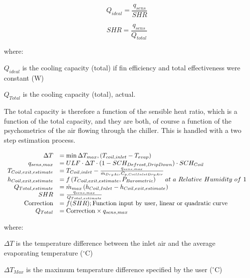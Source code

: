 \begin{equation}
  Q_{ideal} = \frac{q_{sens}}{SHR}
\end{equation}

\begin{equation}
  SHR = \frac{q_{sens}}{Q_{total}}
\end{equation}

where:

\({Q_{ideal}}\) is the cooling capacity (total) if fin efficiency and total effectiveness were constant (W)

\({Q_{Total}}\) is the cooling capacity (total), actual.

The total capacity is therefore a function of the sensible heat ratio, which is a function of the total capacity, and they are both, of course a function of the psychometrics of the air flowing through the chiller. This is handled with a two step estimation process.

\begin{equation}
  \begin{array}{rl}
                  \Delta T &= \min{ \Delta T_{max},\left(T_{coil,inlet} - T_{evap}\right)} \\
              q_{sens,max} &= ULF \cdot \Delta T \cdot \left(1 - SCH_{Defrost,DripDown}\right) \cdot SCH_{Coil} \\ 
    T_{Coil,exit,estimate} &= T_{Coil,inlet} - \frac{q_{sens,max}}{\dot{m}_{DryAir} C_{p,Coil Inlet Dry Air}} \\
    h_{Coil,exit,estimate} &= f\left(T_{Coil,exit,estimate},P_{Barometric}\right)~~~~at~a~Relative~Humidity~of~1 \\
        Q_{Total,estimate} &= \dot{m}_{max}\left(h_{Coil,Inlet} - h_{Coil,exit,estimate}\right) \\
                       SHR &= \frac{q_{sens,max}}{Q_{Total,estimate}} \\
         \text{Correction} &= f(SHR);\text{Function input by user, linear or quadratic curve} \\
                 Q_{Total} &= \text{Correction} \times q_{sens,max}
  \end{array}
\end{equation}

where:

\(\Delta T\) is the temperature difference between the inlet air and the average evaporating temperature (\(^{\circ}\)C)

\(\Delta T{}_{Max}\) is the maximum temperature difference specified by the user (\(^{\circ}\)C)

